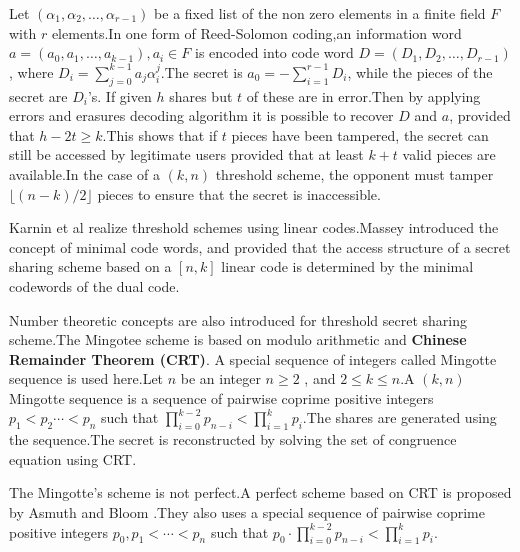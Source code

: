 \documentclass{llncs}
\begin{document}
Let $(\alpha_1,\alpha_2,\ldots,\alpha_{r-1})$ be a fixed list of the non zero elements in a finite field $F$ with $r$ elements.In one form of Reed-Solomon coding,an information word $a=(a_0,a_1,\ldots,a_{k-1}),a_i \in F$ is encoded into code word $D=(D_1,D_2,\ldots,D_{r-1})$, where $D_i=\sum_{j=0}^{k-1}a_j\alpha_i^j$.The secret is $a_0= - \sum_{i=1}^{r-1}D_i$, while the pieces of the secret are $D_i$'s.     
 If given $h$ shares but $t$ of these are in error.Then by applying errors and erasures decoding algorithm it is possible to recover $D$ and $a$, provided that $h-2t \ge k$.This shows that if $t$ pieces have been tampered, the secret can still be accessed by legitimate users provided that at least $k+t$ valid pieces are available.In the case of a $(k,n)$ threshold scheme, the opponent must tamper $\lfloor(n-k)/2\rfloor$ pieces to ensure that the secret is inaccessible.
       
 Karnin et al \cite{karnin1983} realize threshold schemes using linear codes.Massey \cite{massey1993minimal} introduced the concept of minimal code words, and provided that the access structure of a secret sharing scheme based on a $[n,k]$ linear code is determined by the minimal codewords of the dual code.
       


Number theoretic concepts are also introduced for threshold secret sharing scheme.The Mingotee scheme\cite{mignotte1983} is based on modulo arithmetic and \textbf{Chinese Remainder Theorem (CRT)}. A special sequence of integers called Mingotte sequence is used here.Let $n$ be an integer $n \geq 2$ , and $2 \le k \le n$.A $(k,n)$ Mingotte sequence is a sequence of pairwise coprime positive integers $p_1 < p_2 \cdots < p_n $ such that $ \prod_{i=0}^{k-2} p_{n-i} < \prod_{i=1}^{k} p_{i} $.The shares are generated using the sequence.The secret is reconstructed by solving the set of congruence equation using CRT.

The Mingotte's scheme is not perfect.A perfect scheme based on CRT is 
 proposed by Asmuth and Bloom \cite{asmuth1983}.They also uses a special sequence of pairwise coprime positive integers $p_{0},p_{1} < \cdots < p_{n}$ such that $ p_{0}\cdot\prod_{i=0}^{k-2} p_{n-i} < \prod_{i=1}^{k} p_{i} $.
 
\end{document}
